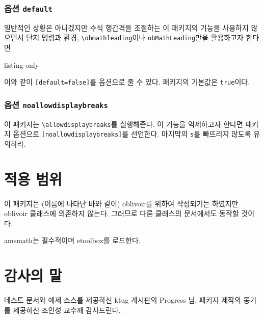 \documentclass[a4paper,amsmath]{oblivoir}
\newcommand\pkg[1]{\textsf{#1}}
\begin{document}
\subsubsection{옵션 \texttt{default}}

일반적인 상황은 아니겠지만 수식 행간격을 조절하는 이 패키지의 기능을 사용하지 않으면서 단지 명령과 환경, \verb|\obmathleading|이나
\verb|obMathLeading|만을 활용하고자 한다면 
\begin{tcblisting}{listing only}
    \usepackage[default=false]{ob-mathleading}
\end{tcblisting}
이와 같이 \verb|[default=false]|를 옵션으로 줄 수 있다. 패키지의 기본값은 \verb|true|이다.

\subsubsection{옵션 \texttt{noallowdisplaybreaks}}

이 패키지는 \verb|\allowdisplaybreaks|를 실행해준다. 이 기능을 억제하고자 한다면
패키지 옵션으로 \verb|[noallowdisplaybreaks]|를 선언한다. 마지막의 \verb|s|를 빠뜨리지 않도록
유의하라.

\section{적용 범위}

이 패키지는 (이름에 나타난 바와 같이) \pkg{oblivoir}를 위하여 작성되기는 하였지만 \pkg{oblivoir} 클래스에
의존하지 않는다. 그러므로 다른 클래스의 문서에서도 동작할 것이다.

\pkg{amsmath}는 필수적이며 \pkg{etoolbox}를 로드한다.

\section{감사의 말}

테스트 문서와 예제 소스를 제공하신 ktug 게시판의 Progress 님, 패키지 제작의 동기를 제공하신 조인성 교수께 감사드린다.
\end{document}
